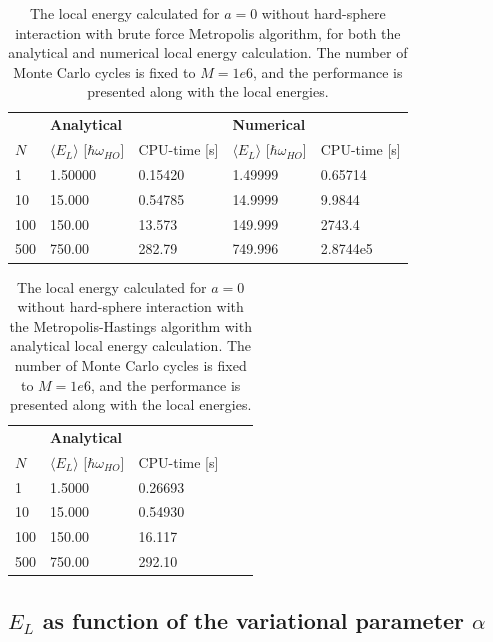 \documentclass[norsk,a4paper,12pt]{article}
\begin{document}
\begin{table} [H]
	\centering
	\caption{The local energy calculated for $a=0$  without hard-sphere interaction with brute force Metropolis algorithm, for both the analytical and numerical local energy calculation. The number of Monte Carlo cycles is fixed to $M=1e6$, and the performance is presented along with the local energies. }
	\begin{tabularx}{\textwidth}{X|XX|XX} \hline
		\label{tab:BFmet}
		& \multicolumn{2}{X}{\textbf{Analytical}} & \multicolumn{2}{X}{\textbf{Numerical}} \\
		$N$ & $\langle E_L\rangle$ [$\hbar\omega_{HO}$] & CPU-time [s] & $\langle E_L\rangle$ [$\hbar\omega_{HO}$] & CPU-time [s]\\ \hline
		1 & 1.50000 & 0.15420 & 1.49999 & 0.65714 \\
		10 & 15.000 & 0.54785 & 14.9999 & 9.9844 \\
		100 & 150.00 & 13.573 & 149.999 & 2743.4\\
		500 & 750.00 & 282.79 & 749.996 & 2.8744e5\\ \hline
	\end{tabularx}
\end{table}

\begin{table} [H]
	\centering
	\caption{The local energy calculated for $a=0$  without hard-sphere interaction with the Metropolis-Hastings algorithm with analytical local energy calculation. The number of Monte Carlo cycles is fixed to $M=1e6$, and the performance is presented along with the local energies.}
	\begin{tabularx}{\textwidth}{X|XX|XX} \hline
		\label{tab:ISmet}
		& \textbf{Analytical} \\
		$N$ & $\langle E_L\rangle$ [$\hbar\omega_{HO}$] & CPU-time [s] \\ \hline
		1 & 1.5000 & 0.26693  \\
		10 & 15.000 &  0.54930  \\
		100 & 150.00 & 16.117 \\
		500 & 750.00 & 292.10 \\ \hline
	\end{tabularx}
\end{table}


 \subsection{$E_L$ as function of the variational parameter $\alpha$}
\end{document}
